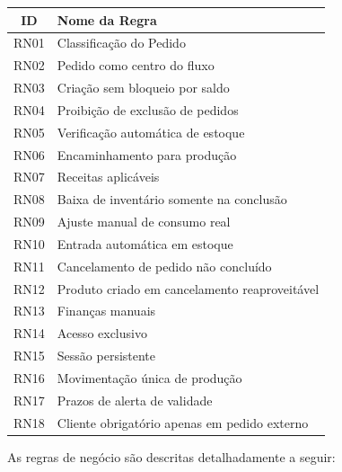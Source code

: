 \begin{quadro}
    \centering

    \label{quadro:regras_negocio_resumo}
    \begin{tabular}{|c|p{10cm}|}
        \hline
        \textbf{ID} & \textbf{Nome da Regra} \\ \hline
        RN01 & Classificação do Pedido \\ \hline
        RN02 & Pedido como centro do fluxo \\ \hline
        RN03 & Criação sem bloqueio por saldo \\ \hline
        RN04 & Proibição de exclusão de pedidos \\ \hline
        RN05 & Verificação automática de estoque \\ \hline
        RN06 & Encaminhamento para produção \\ \hline
        RN07 & Receitas aplicáveis \\ \hline
        RN08 & Baixa de inventário somente na conclusão \\ \hline
        RN09 & Ajuste manual de consumo real \\ \hline
        RN10 & Entrada automática em estoque \\ \hline
        RN11 & Cancelamento de pedido não concluído \\ \hline
        RN12 & Produto criado em cancelamento reaproveitável \\ \hline
        RN13 & Finanças manuais \\ \hline
        RN14 & Acesso exclusivo \\ \hline
        RN15 & Sessão persistente \\ \hline
        RN16 & Movimentação única de produção \\ \hline
        RN17 & Prazos de alerta de validade \\ \hline
        RN18 & Cliente obrigatório apenas em pedido externo \\ \hline
    \end{tabular}

    \vspace{0.2cm}

\end{quadro}

As regras de negócio são descritas detalhadamente a seguir:

